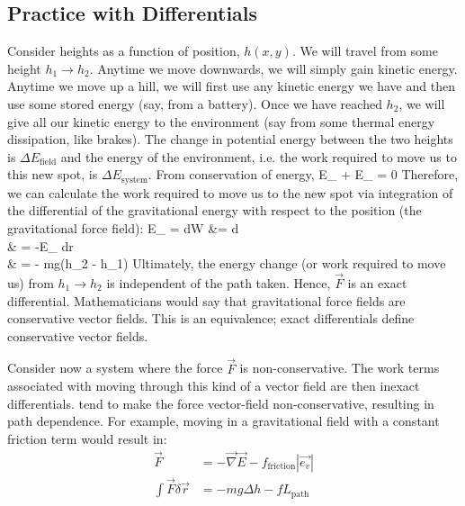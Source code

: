 \documentclass[12pt]{article}
\begin{document}
\subsection{Practice with Differentials}
Consider heights as a function of position, $h(x,y)$.  We will travel from some height $h_1 \rightarrow h_2$.  Anytime we move downwards, we will simply gain kinetic energy.  Anytime we move up a hill, we will first use any kinetic energy we have and then use some stored energy (say, from a battery).  Once we have reached $h_2$, we will give all our kinetic energy to the environment (say from some thermal energy dissipation, like brakes). %
The change in potential energy between the two heights is $\Delta E_\text{field}$ and the energy of the environment, i.e. the work required to move us to this new spot, is $\Delta E_\text{system}$.  From conservation of energy,
\eqs
\Delta E_ + \Delta E_ = 0
\eqe
Therefore, we can calculate the work required to move us to the new spot via integration of the differential of the gravitational energy with respect to the position (the gravitational force field):
\eqs
\Delta E_ = dW &= \int {} \cdot d\\
& = -\int \nabla E_ \cdot dr\\
& = - mg(h_2 - h_1)
\eqe
Ultimately, the energy change (or work required to move us) from $h_1 \rightarrow h_2$ is independent of the path taken.  Hence, $\vec{F}$ is an exact differential. Mathematicians would say that gravitational force fields are conservative vector fields. This is an equivalence; exact differentials define conservative vector fields.

  Consider now a system where the force $\vec{F}$ is non-conservative.  The work terms associated with moving through this kind of a vector field are then inexact differentials.  tend to make the force vector-field non-conservative, resulting in path dependence. For example, moving in a gravitational field with a constant friction term would result in:
\begin{align*}
\vec{F} &= -\vec{\nabla}\vec{E} - f_\text{friction} | \vec{e_v}|\\
\int \vec{F}\delta\vec{r} &= -mg\Delta h- f L_\text{path}
\end{align*} 
\end{document}

